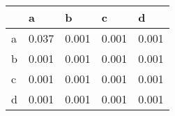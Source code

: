 \begin{tabular}{lllll}
\toprule
{} &      a &      b &      c &      d \\
\midrule
a &  0.037 &  0.001 &  0.001 &  0.001 \\
b &  0.001 &  0.001 &  0.001 &  0.001 \\
c &  0.001 &  0.001 &  0.001 &  0.001 \\
d &  0.001 &  0.001 &  0.001 &  0.001 \\
\bottomrule
\end{tabular}
